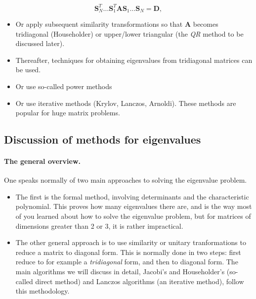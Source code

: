 \noindent
\begin{equation}
   \mathbf{S}_N^T\dots \mathbf{S}_1^T\mathbf{A}\mathbf{S}_1\dots \mathbf{S}_N=\mathbf{D} ,
\end{equation}
\begin{itemize}
 \item Or apply subsequent similarity transformations so that $\mathbf{A}$ becomes tridiagonal (Householder) or upper/lower triangular (the \emph{QR} method to be discussed later). 

 \item Thereafter, techniques for obtaining eigenvalues from tridiagonal matrices can be used.

 \item Or use so-called power methods

 \item Or use iterative methods (Krylov, Lanczos, Arnoldi). These methods are popular for huge matrix problems.
\end{itemize}

\noindent



\subsection*{Discussion of  methods for eigenvalues}

\paragraph{The general overview.}

One speaks normally of two main approaches to solving the eigenvalue problem.
\begin{itemize}
 \item The first is the formal method, involving determinants and the  characteristic polynomial. This proves how many eigenvalues  there are, and is the way most of you learned about how to solve the eigenvalue problem, but for matrices of dimensions greater than 2 or 3, it is rather impractical.

 \item The other general approach is to use similarity or unitary tranformations  to reduce a matrix to diagonal form. This is normally done in two steps: first reduce to for example a \emph{tridiagonal} form, and then to diagonal form. The main algorithms we will discuss in detail, Jacobi's and  Householder's  (so-called direct method) and Lanczos algorithms (an iterative method), follow this methodology. 
\end{itemize}

